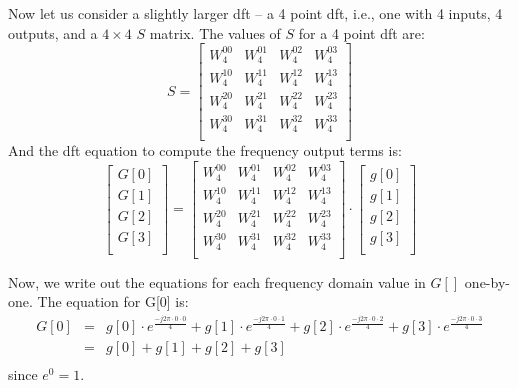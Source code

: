 Now let us consider a slightly larger \gls{dft} -- a 4 point \gls{dft}, i.e., one with 4 inputs, 4 outputs, and a $4 \times 4$ $S$ matrix. The values of $S$ for a 4 point \gls{dft} are:
\begin{equation}
S =
 \begin{bmatrix}
  W^{0 0}_4 & W^{0 1}_4 & W^{0 2}_4 & W^{0 3}_4 \\
  W^{1 0}_4 & W^{1 1}_4 & W^{1 2}_4 & W^{1 3}_4 \\
  W^{2 0}_4 & W^{2 1}_4 & W^{2 2}_4 & W^{2 3}_4 \\
  W^{3 0}_4 & W^{3 1}_4 & W^{3 2}_4 & W^{3 3}_4 \\
 \end{bmatrix}
 \end{equation}
And the \gls{dft} equation to compute the frequency output terms is:
\begin{equation}
\begin{bmatrix} 
G[0] \\
G[1] \\
G[2] \\
G[3] \\
\end{bmatrix} = 
 \begin{bmatrix}
  W^{0 0}_4 & W^{0 1}_4 & W^{0 2}_4 & W^{0 3}_4 \\
  W^{1 0}_4 & W^{1 1}_4 & W^{1 2}_4 & W^{1 3}_4 \\
  W^{2 0}_4 & W^{2 1}_4 & W^{2 2}_4 & W^{2 3}_4 \\
  W^{3 0}_4 & W^{3 1}_4 & W^{3 2}_4 & W^{3 3}_4 \\
 \end{bmatrix}
 \cdot
  \begin{bmatrix}
  g[0] \\
  g[1]\\
  g[2]\\
  g[3]\\
\end{bmatrix}
\end{equation}


Now, we write out the equations for each frequency domain value in $G[]$ one-by-one. The equation for G[0] is:
\begin{equation}
\begin{array} {lll} 
G[0] & = & g[0] \cdot e^{\frac{-j 2 \pi \cdot 0 \cdot 0}{4}} + g[1] \cdot e^{\frac{-j 2 \pi \cdot 0 \cdot 1}{4}} + g[2] \cdot e^{\frac{-j 2 \pi \cdot 0 \cdot 2}{4}} + g[3] \cdot e^{\frac{-j 2 \pi \cdot 0 \cdot 3}{4}}\\
 & = & g[0] + g[1] + g[2] + g[3] \\
\end{array}
\end{equation} since $e^0 = 1$. 


